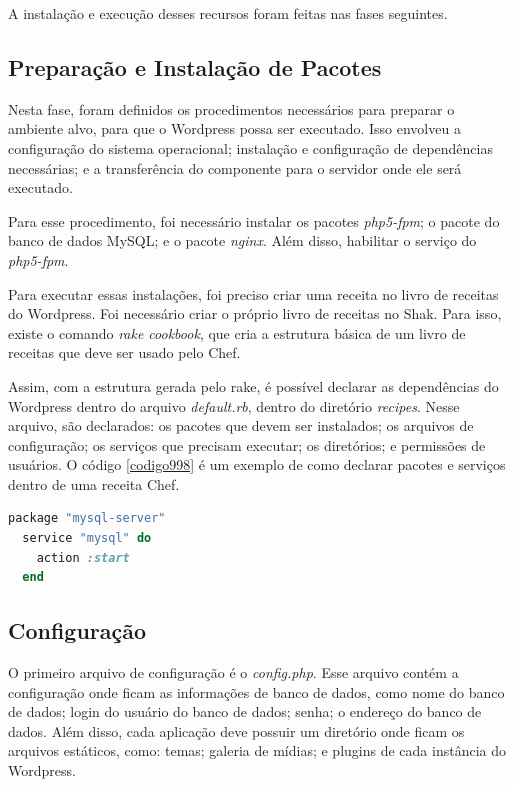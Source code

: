 A instalação e execução desses recursos foram feitas nas fases seguintes.

\subsection{Preparação e Instalação de Pacotes}
\label{wordpress:preparacao}

Nesta fase, foram definidos os procedimentos necessários para 
preparar o ambiente alvo, para que o Wordpress
possa ser executado. Isso envolveu a configuração do sistema operacional; instalação
e configuração de dependências necessárias; e a transferência do componente
para o servidor onde ele será executado.

Para esse procedimento, foi necessário instalar os pacotes \textit{php5-fpm}; o pacote
do banco de dados MySQL; e o pacote \textit{nginx}. Além disso, habilitar o serviço do
\textit{php5-fpm}.
 
Para executar essas instalações, foi preciso criar uma receita no livro de receitas
do Wordpress. Foi necessário criar o próprio livro de receitas no Shak.
Para isso, existe o comando \textit{rake cookbook}, que cria a estrutura básica
de um livro de receitas que deve ser usado pelo Chef.

Assim, com a estrutura gerada pelo rake, é possível declarar as dependências do Wordpress
dentro do arquivo \textit{default.rb}, dentro do diretório \textit{recipes}. Nesse 
arquivo, são declarados: os pacotes que devem ser instalados; os arquivos de configuração;
os serviços que precisam executar; os diretórios; e permissões de usuários. O código \ref{codigo998}
é um exemplo de como declarar pacotes e serviços dentro de uma receita Chef.

\begin{lstlisting}[language=Ruby,label=dice_index,caption={Exemplo de criação de serviço do mysql com o chef}, label=codigo998]
  package "mysql-server"
  service "mysql" do
    action :start
  end
\end{lstlisting}

\subsection{Configuração}
\label{wordpress:preparacao}

O primeiro arquivo de configuração é o \textit{config.php}. Esse arquivo contém a
configuração onde ficam as informações de banco de dados, como nome do banco de dados;
login do usuário do banco de dados; senha; o endereço do banco de dados. Além disso,
cada aplicação deve possuir um diretório
onde ficam os arquivos estáticos, como: temas; galeria de mídias; e plugins 
de cada instância do Wordpress.


